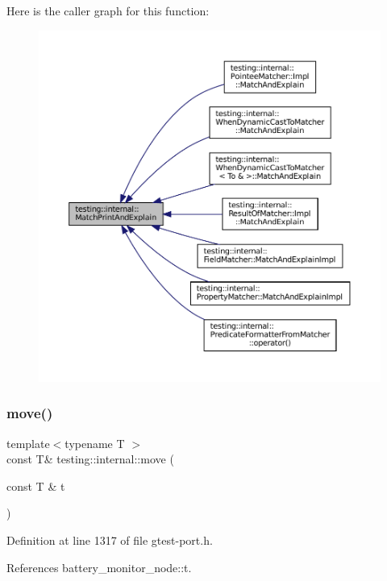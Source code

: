 Here is the caller graph for this function\+:
\nopagebreak
\begin{figure}[H]
\begin{center}
\leavevmode
\includegraphics[width=350pt]{namespacetesting_1_1internal_a0821df2611d54c79bac990719ad8a2dd_icgraph}
\end{center}
\end{figure}
\mbox{\label{namespacetesting_1_1internal_a0f6d06bf8c3093b9c22bb08723db201e}} 
\subsubsection{\texorpdfstring{move()}{move()}}
{\footnotesize\ttfamily template$<$typename T $>$ \\
const T\& testing\+::internal\+::move (\begin{DoxyParamCaption}\item[{const T \&}]{t }\end{DoxyParamCaption})}



Definition at line 1317 of file gtest-\/port.\+h.



References battery\+\_\+monitor\+\_\+node\+::t.



